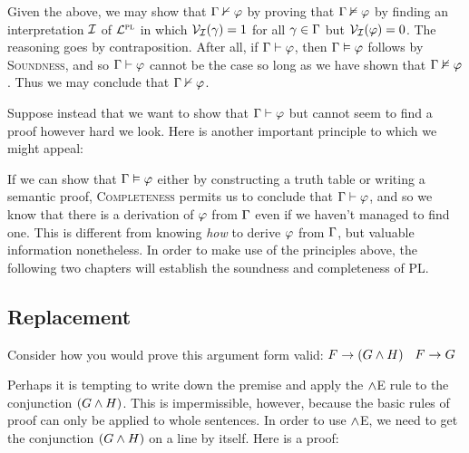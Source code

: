 
Given the above, we may show that $\Gamma \nvdash \varphi$ by proving that $\Gamma \nvDash \varphi$ by finding an interpretation $\mathcal{I}$ of $\mathcal{L}^{\textsc{pl}}$ in which $\mathcal{V}_{\mathcal{I}}(\gamma) = 1$ for all $\gamma \in \Gamma$ but $\mathcal{V}_{\mathcal{I}}(\varphi) = 0$. 
The reasoning goes by contraposition.
After all, if $\Gamma \vdash \varphi$, then $\Gamma \vDash \varphi$ follows by \textsc{Soundness}, and so $\Gamma \vdash \varphi$ cannot be the case so long as we have shown that $\Gamma \nvDash \varphi$.
Thus we may conclude that $\Gamma \nvdash \varphi$.

Suppose instead that we want to show that $\Gamma \vdash \varphi$ but cannot seem to find a proof however hard we look. 
Here is another important principle to which we might appeal:


If we can show that $\Gamma \vDash \varphi$ either by constructing a truth table or writing a semantic proof, \textsc{Completeness} permits us to conclude that $\Gamma \vdash \varphi$, and so we know that there is a derivation of $\varphi$ from $\Gamma$ even if we haven't managed to find one.
This is different from knowing \textit{how} to derive $\varphi$ from $\Gamma$, but valuable information nonetheless. 
In order to make use of the principles above, the following two chapters will establish the soundness and completeness of PL.







\iffalse

\subsection{Replacement}

Consider how you would prove this argument form valid: $F\rightarrow(G\wedge H)$ \therefore\ $F\rightarrow G$

Perhaps it is tempting to write down the premise and apply the $\wedge$E rule to the conjunction $(G \wedge H)$. This is impermissible, however, because the basic rules of proof can only be applied to whole sentences. In order to use $\wedge$E, we need to get the conjunction $(G \wedge H)$ on a line by itself. Here is a proof:

